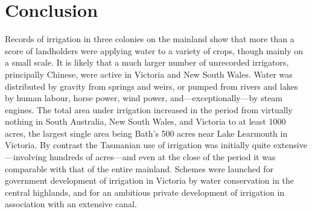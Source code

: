 \section*{Conclusion}

Records of irrigation in three colonies on the mainland show that more
than a score of landholders were applying water to a variety of crops,
though mainly on a small scale.  It is likely that a much larger
number of unrecorded irrigators, principally Chinese, were active in
Victoria and New South Wales.  Water was distributed by gravity from
springs and weirs, or pumped from rivers and lakes by human labour,
horse power, wind power, and---exceptionally---by steam engines.  The
total area under irrigation increased in the period from virtually
nothing in South Australia, New South Wales, and Victoria to at least
1000 acres, the largest single area being Bath's 500 acres near Lake
Learmonth in Victoria.  By contrast the Tasmanian use of irrigation
was initially quite extensive---involving hundreds of acres---and even
at the close of the period it was comparable with that of the entire
mainland. Schemes were launched for government development of
irrigation in Victoria by water conservation in the central highlands,
and for an ambitious private development of irrigation in association
with an extensive canal.


